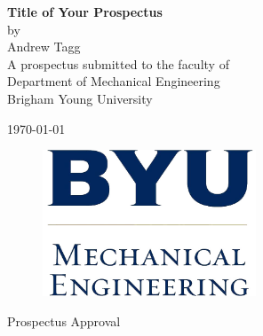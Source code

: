 \documentclass[12pt, letterpaper]{article}
\begin{document}
\begin{titlepage}

\begin{center}

\vspace*{\fill}

\vspace{0.5in}

{ \LARGE \bfseries Title of Your Prospectus}\\[.25in]

\large
by\\[.25 in]
Andrew Tagg \\[1in]

A prospectus submitted to the faculty of\\
Department of Mechanical Engineering\\
Brigham Young University

\vspace{1in}

\today

\vspace*{\fill}

\end{center}

\end{titlepage}

\thispagestyle{empty}

\begin{center}
\vspace*{\fill}

\begin{figure}[htbp] %
   \centering
   \includegraphics[width=2.5in]{byume_logo_clear.jpg} 
\end{figure}

\vspace{0.5in}

\Large{Prospectus Approval}\\[0.5in]

\end{center}
\end{document}
